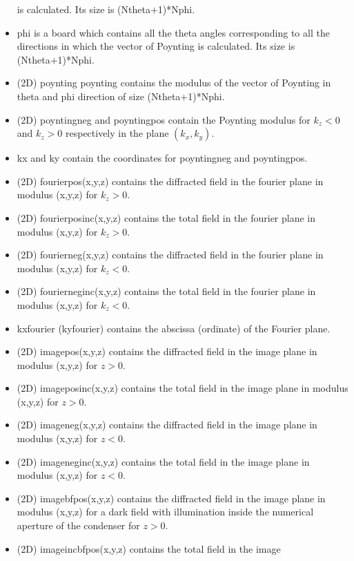 \begin{itemize}
  is calculated. Its size is (Ntheta+1)*Nphi.
\item phi is a board which contains all the theta angles corresponding
  to all the directions in which the vector of Poynting is
  calculated. Its size is (Ntheta+1)*Nphi.
\item (2D) poynting poynting contains the modulus of the vector of
  Poynting in theta and phi direction of size (Ntheta+1)*Nphi.
\item (2D) poyntingneg and poyntingpos contain the Poynting modulus for
  $k_z<0$ and $k_z>0$ respectively in the plane $(k_x,k_y)$.
\item kx and ky contain the coordinates for poyntingneg and
  poyntingpos.
\item (2D) fourierpos(x,y,z) contains the diffracted field in the fourier
  plane in modulus (x,y,z) for $k_z>0$.
\item (2D) fourierposinc(x,y,z) contains the total field in the fourier
  plane in modulus (x,y,z) for $k_z>0$.
\item (2D) fourierneg(x,y,z) contains the diffracted field in the fourier
  plane in modulus (x,y,z) for $k_z<0$.
\item (2D) fourierneginc(x,y,z) contains the total field in the fourier
  plane in modulus (x,y,z) for $k_z<0$.
\item kxfourier (kyfourier) contains the abscissa (ordinate) of the
  Fourier plane.
\item (2D) imagepos(x,y,z) contains the diffracted field in the image
  plane in modulus (x,y,z) for $z>0$.
\item (2D) imageposinc(x,y,z) contains the total field in the image plane
  in modulus (x,y,z) for $z>0$.
\item (2D) imageneg(x,y,z) contains the diffracted field in the image
  plane in modulus (x,y,z) for $z<0$.
\item (2D) imageneginc(x,y,z) contains the total field in the image plane
  in modulus (x,y,z) for $z<0$.
\item (2D) imagebfpos(x,y,z) contains the diffracted field in the
  image plane in modulus (x,y,z) for a dark field with illumination
  inside the numerical aperture of the condenser for $z>0$.
\item (2D) imageincbfpos(x,y,z) contains the total field in the image

\end{itemize}
